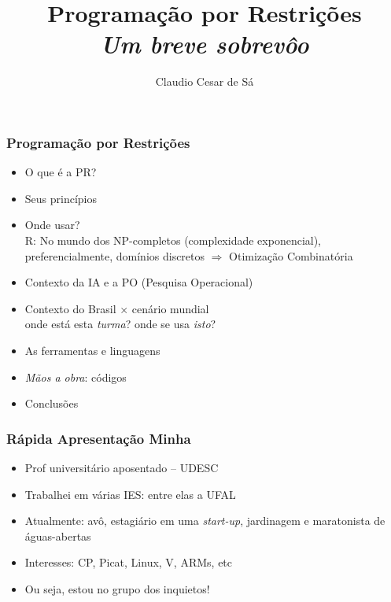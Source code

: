 \documentclass{beamer}
\title[Combinatorial  Optimization] %
{Programação por Restrições \\ \textit{Um breve sobrevôo}}
\author[Claudio Cesar de Sá] 
{Claudio Cesar de Sá}%
\institute[WhatsTV]{Independent Researcher and WhatsTV Inc.}
\date[\today] %
\begin{document}
\begin{frame}
  \titlepage
  
\end{frame}

\begin{frame}[fragile]

\frametitle{Programação por Restrições}

    \begin{itemize}
        \item O que é a PR?
        \item Seus princípios
        \item Onde usar? \\
        R: No mundo dos NP-completos (complexidade exponencial), preferencialmente, domínios discretos $\Rightarrow$ Otimização Combinatória
        \item Contexto da IA e a PO (Pesquisa Operacional)
        \item Contexto do Brasil $\times $ cenário mundial\\ 
        onde está esta {\em turma}? onde se usa {\em isto}?
        \item As ferramentas e linguagens
        \item {\em Mãos a obra}: códigos
        \item Conclusões 
    \end{itemize}

\end{frame}

 \begin{frame}[fragile]

\frametitle{Rápida Apresentação Minha}
\begin{itemize}
    \item Prof universitário aposentado -- UDESC
    \item Trabalhei em várias IES: entre elas a UFAL
    \item Atualmente: avô, estagiário em uma {\em start-up}, jardinagem e maratonista de águas-abertas
    \item Interesses: CP, Picat, Linux, V, ARMs, etc
    \item Ou seja, estou no grupo dos inquietos!
\end{itemize}

\end{frame}
\end{document}
